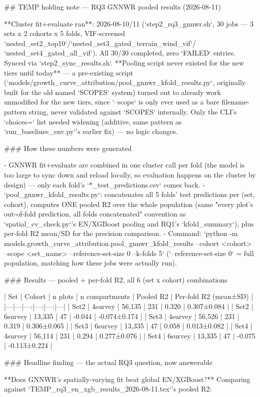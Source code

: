 ## TEMP holding note — RQ3 GNNWR pooled results (2026-08-11)

**Cluster fit+evaluate ran**: 2026-08-10/11 (`step2_rq3_gnnwr.sh`, 30 jobs — 3 sets x 2 cohorts x
5 folds, VIF-screened `nested_set2_top10`/`nested_set3_gated_terrain_wind_vif`/
`nested_set4_gated_all_vif`). All 30/30 completed, zero `FAILED` entries. Synced via
`step2_sync_results.sh`. **Pooling script never existed for the new tiers until today** — a
pre-existing script (`models/growth_curve_attribution/pool_gnnwr_kfold_results.py`, originally
built for the old named `SCOPES` system) turned out to already work unmodified for the new tiers,
since `--scope` is only ever used as a bare filename-pattern string, never validated against
`SCOPES` internally. Only the CLI's `choices=` list needed widening (additive, same pattern as
`run_baselines_env.py`'s earlier fix) — no logic changes.

### How these numbers were generated

- GNNWR fit+evaluate are combined in one cluster call per fold (the model is too large to sync
  down and reload locally, so evaluation happens on the cluster by design) — only each fold's
  `*_test_predictions.csv` comes back.
- `pool_gnnwr_kfold_results.py`: concatenates all 5 folds' test predictions per (set, cohort),
  computes ONE pooled R2 over the whole population (same "every plot's out-of-fold prediction,
  all folds concatenated" convention as `spatial_cv_check.py`'s EN/XGBoost pooling and RQ1's
  `kfold_summary`), plus per-fold R2 mean/SD for the precision comparison.
- Command: `python -m models.growth_curve_attribution.pool_gnnwr_kfold_results --cohort <cohort> --scope <set_name> --reference-set-size 0 --k-folds 5`
  (`--reference-set-size 0` = full population, matching how these jobs were actually run).

### Results — pooled + per-fold R2, all 6 (set x cohort) combinations

| Set | Cohort | n plots | n compartments | Pooled R2 | Per-fold R2 (mean±SD) |
|---|---|---:|---:|---:|---|
| Set2 | 4survey | 56,135 | 231 | 0.320 | 0.307±0.084 |
| Set2 | 6survey | 13,335 | 47 | -0.044 | -0.074±0.174 |
| Set3 | 4survey | 56,526 | 231 | 0.319 | 0.306±0.065 |
| Set3 | 6survey | 13,335 | 47 | 0.058 | 0.013±0.082 |
| Set4 | 4survey | 56,114 | 231 | 0.294 | 0.277±0.076 |
| Set4 | 6survey | 13,335 | 47 | -0.075 | -0.113±0.224 |

### Headline finding — the actual RQ3 question, now answerable

**Does GNNWR's spatially-varying fit beat global EN/XGBoost?** Comparing against
`TEMP_rq3_en_xgb_results_2026-08-11.tex`'s pooled R2:

